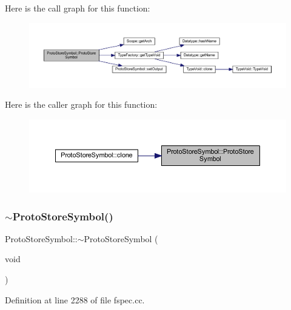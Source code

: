 Here is the call graph for this function\+:
\nopagebreak
\begin{figure}[H]
\begin{center}
\leavevmode
\includegraphics[width=350pt]{class_proto_store_symbol_ac124539bc8682646d3cd44dcb84ee960_cgraph}
\end{center}
\end{figure}
Here is the caller graph for this function\+:
\nopagebreak
\begin{figure}[H]
\begin{center}
\leavevmode
\includegraphics[width=350pt]{class_proto_store_symbol_ac124539bc8682646d3cd44dcb84ee960_icgraph}
\end{center}
\end{figure}
\mbox{\label{class_proto_store_symbol_aa9b1e5730ea26546b4cb1ef587e16daf}} 
\subsubsection{\texorpdfstring{$\sim$ProtoStoreSymbol()}{~ProtoStoreSymbol()}}
{\footnotesize\ttfamily Proto\+Store\+Symbol\+::$\sim$\+Proto\+Store\+Symbol (\begin{DoxyParamCaption}\item[{void}]{ }\end{DoxyParamCaption})\hspace{0.3cm}{\ttfamily [virtual]}}



Definition at line 2288 of file fspec.\+cc.



